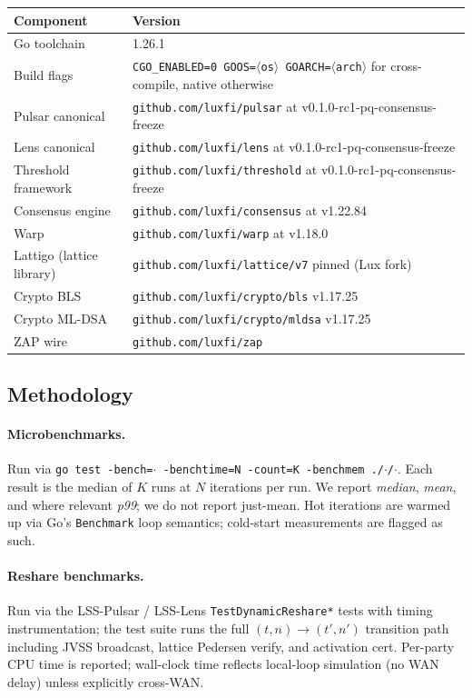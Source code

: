 \begin{tabular}{@{}p{}p{}@{}}
  \toprule
  \textbf{Component} & \textbf{Version} \\
  \midrule
  Go toolchain & 1.26.1 \\
  Build flags & \texttt{CGO\_ENABLED=0 GOOS=$\langle$os$\rangle$ GOARCH=$\langle$arch$\rangle$} for cross-compile, native otherwise \\
  Pulsar canonical & \texttt{github.com/luxfi/pulsar} at v0.1.0-rc1-pq-consensus-freeze \cite{pulsar} \\
  Lens canonical & \texttt{github.com/luxfi/lens} at v0.1.0-rc1-pq-consensus-freeze \cite{lensgo} \\
  Threshold framework & \texttt{github.com/luxfi/threshold} at v0.1.0-rc1-pq-consensus-freeze \cite{thresholdgo} \\
  Consensus engine & \texttt{github.com/luxfi/consensus} at v1.22.84 \cite{consensusgo} \\
  Warp & \texttt{github.com/luxfi/warp} at v1.18.0 \cite{warpgo} \\
  Lattigo (lattice library) & \texttt{github.com/luxfi/lattice/v7} pinned (Lux fork) \cite{lattigov7} \\
  Crypto BLS & \texttt{github.com/luxfi/crypto/bls} v1.17.25 \\
  Crypto ML-DSA & \texttt{github.com/luxfi/crypto/mldsa} v1.17.25 \\
  ZAP wire & \texttt{github.com/luxfi/zap} \\
  \bottomrule
\end{tabular}

\subsection{Methodology}

\paragraph{Microbenchmarks.} Run via \texttt{go test -bench=$\cdot$ -benchtime=N -count=K -benchmem ./$\cdot$/$\cdot$}. Each result is the median of $K$ runs at $N$ iterations per run. We report \emph{median}, \emph{mean}, and where relevant \emph{p99}; we do not report just-mean. Hot iterations are warmed up via Go's \texttt{Benchmark} loop semantics; cold-start measurements are flagged as such.

\paragraph{Reshare benchmarks.} Run via the LSS-Pulsar / LSS-Lens \texttt{TestDynamicReshare*} tests with timing instrumentation; the test suite runs the full $(t, n) \to (t', n')$ transition path including JVSS broadcast, lattice Pedersen verify, and activation cert. Per-party CPU time is reported; wall-clock time reflects local-loop simulation (no WAN delay) unless explicitly cross-WAN.

